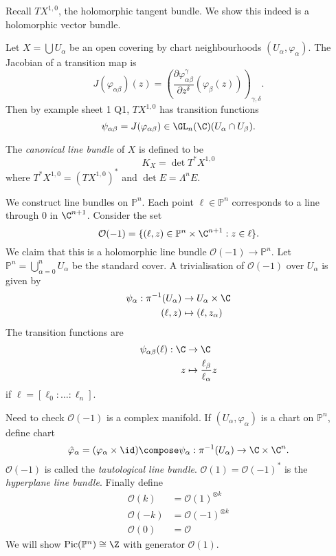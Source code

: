 \documentclass[a4paper]{article}
\renewcommand{\P}{\mathbb P} %
\DeclareMathOperator{\Pic}{Pic} %
\begin{document}
\begin{eg}
  Recall \(TX^{1, 0}\), the holomorphic tangent bundle. We show this indeed is a holomorphic vector bundle.

  Let \(X = \bigcup U_\alpha\) be an open covering by chart neighbourhoods \((U_\alpha, \varphi_\alpha)\). The Jacobian of a transition map is
  \[
    J(\varphi_{\alpha\beta})(z) = \left( \frac{\partial \varphi_{\alpha\beta}^\gamma}{\partial z^\delta} (\varphi_\beta(z)) \right)_{\gamma, \delta}.
  \]
  Then by example sheet 1 Q1, \(TX^{1, 0}\) has transition functions
  \[
    \psi_{\alpha\beta} = J(\varphi_{\alpha\beta}) \in \GL_n(\C) (U_\alpha \cap U_\beta).
  \]

  \begin{definition}
    The \emph{canonical line bundle} of \(X\) is defined to be
    \[
      K_X = \det T^*X^{1, 0}
    \]
    where \(T^*X^{1, 0} = (TX^{1, 0})^*\) and \(\det E = \Lambda^n E\).
\end{definition}
\end{eg}

\begin{eg}
  We construct line bundles on \(\P^n\). Each point \(\ell \in \P^n\) corresponds to a line through \(0\) in \(\C^{n + 1}\). Consider the set
  \[
    \mathcal O(-1) = \{(\ell, z) \in \P^n \times \C^{n + 1}: z \in \ell\}.
  \]
  We claim that this is a holomorphic line bundle \(\mathcal O(-1) \to \P^n\). Let \(\P^n = \bigcup_{\alpha = 0}^n U_\alpha\) be the standard cover. A trivialisation of \(\mathcal O(-1)\) over \(U_\alpha\) is given by
  \begin{align*}
    \psi_\alpha: \pi^{-1}(U_\alpha) &\to U_\alpha \times \C \\
    (\ell, z) &\mapsto (\ell, z_\alpha)
  \end{align*}
  The transition functions are
  \begin{align*}
    \psi_{\alpha\beta}(\ell): \C &\to \C \\
    z &\mapsto \frac{\ell_\beta}{\ell_\alpha} z
  \end{align*}
  if \(\ell = [\ell_0 : \dots : \ell_n]\).

  Need to check \(\mathcal O(-1)\) is a complex manifold. If \((U_\alpha, \varphi_\alpha)\) is a chart on \(\P^n\), define chart
  \[
    \hat \varphi_\alpha = (\varphi_\alpha \times \id) \compose \psi_\alpha: \pi^{-1}(U_\alpha) \to \C \times \C^n.
  \]
  \(\mathcal O(-1)\) is called the \emph{tautological line bundle}. \(\mathcal O(1) = \mathcal O(-1)^*\) is the \emph{hyperplane line bundle}. Finally define
  \begin{align*}
    \mathcal O(k) &= \mathcal O(1)^{\otimes k} \\
    \mathcal O(-k) &= \mathcal O(-1)^{\otimes k} \\
    \mathcal O(0) &= \mathcal O
  \end{align*}
  We will show \(\Pic(\P^n) \cong \Z\) with generator \(\mathcal O(1)\).
\end{eg}
\end{document}
